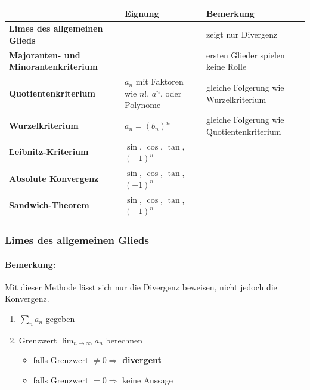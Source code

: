 \documentclass[11pt]{article}
\begin{document}
\begin{table}[H]
\centering
\begin{tabular}{|p{5cm}|p{4cm}|p{5cm}|}
\hline
                                             & \textbf{Eignung}    & \textbf{Bemerkung}                        \\ \hline
\textbf{Limes des allgemeinen Glieds}        &                     & zeigt nur Divergenz                       \\ \hline
\textbf{Majoranten- und Minorantenkriterium} &                     & ersten Glieder spielen keine Rolle        \\ \hline
\textbf{Quotientenkriterium}                 & $a_n$ mit Faktoren wie $n!$, $a^n$, oder Polynome & gleiche Folgerung wie Wurzelkriterium     \\ \hline
\textbf{Wurzelkriterium}                     & $a_n = (b_n)^n$     & gleiche Folgerung wie Quotientenkriterium \\ \hline
\textbf{Leibnitz-Kriterium}                  & $\sin$, $\cos$, $\tan$, $(-1)^n$ &                                           \\ \hline
\textbf{Absolute Konvergenz}                 & $\sin$, $\cos$, $\tan$, $(-1)^n$   &                                           \\ \hline
\textbf{Sandwich-Theorem}					 & $\sin$, $\cos$, $\tan$, $(-1)^n$ & \\ \hline
\end{tabular}
\end{table}
\subsubsection*{Limes des allgemeinen Glieds}

\paragraph{Bemerkung:} Mit dieser Methode lässt sich nur die Divergenz beweisen, nicht jedoch die Konvergenz.

\begin{enumerate}
	\item $\sum_n a_n$ gegeben
	\item Grenzwert $\lim_{n\mapsto\infty} a_n$ berechnen
	\begin{itemize}
		\item falls Grenzwert $\neq 0 \Rightarrow$ \textbf{divergent} 
		\item falls Grenzwert $= 0 \Rightarrow$ keine Aussage 
	\end{itemize}
\end{enumerate}
\end{document}
